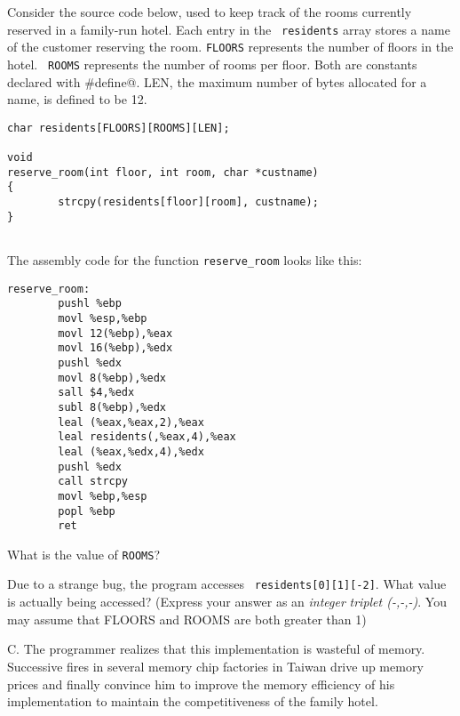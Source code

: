 \begin{problem}{14}

Consider the source code below, used to keep track of the rooms
currently reserved in a family-run hotel. Each entry in the {\tt
residents} array stores a name of the customer reserving the
room. {\tt FLOORS} represents the number of floors in the hotel.  {\tt
ROOMS} represents the number of rooms per floor.  Both are constants
declared with \verb@#define@. LEN, the maximum number of bytes
allocated for a name, is defined to be 12.

\begin{verbatim}
char residents[FLOORS][ROOMS][LEN];

void
reserve_room(int floor, int room, char *custname)
{
        strcpy(residents[floor][room], custname);
}


\end{verbatim}

The assembly code for the function {\tt reserve\_room} looks like this:

\begin{verbatim}
reserve_room:
        pushl %ebp
        movl %esp,%ebp
        movl 12(%ebp),%eax
        movl 16(%ebp),%edx
        pushl %edx
        movl 8(%ebp),%edx
        sall $4,%edx
        subl 8(%ebp),%edx
        leal (%eax,%eax,2),%eax
        leal residents(,%eax,4),%eax
        leal (%eax,%edx,4),%edx
        pushl %edx
        call strcpy
        movl %ebp,%esp
        popl %ebp
        ret
\end{verbatim}

\begin{choice}
\item What is the value of {\tt ROOMS}?

\vspace{.4 in}

\item Due to a strange bug, the program accesses {\tt
residents[0][1][-2]}. What value is actually being accessed? (Express
your answer as an \emph{integer} \emph{triplet (-,-,-)}. You may 
assume that FLOORS and ROOMS are both greater than 1)

\vspace{.4 in}

\end{choice}
\end{problem}

\newpage

C. The programmer realizes that this implementation is wasteful of
memory. Successive fires in several memory chip factories in Taiwan
drive up memory prices and finally convince him to improve the memory
efficiency of his implementation to maintain the competitiveness
of the family hotel. 

